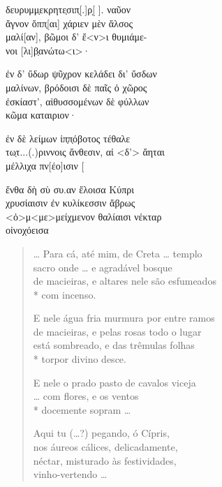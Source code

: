 \begin{gkverse}
\dagger{}δευρυμμ̣εκρητε̣σιπ̣[.]ρ[̣ \quad].\dagger{} ναῦον\\
ἄγνον ὄππ̣[αι\quad] χάριεν μὲν ἄλσος\\
μαλί[αν], βῶμοι δ’ ἔ<ν>ι θυμιάμε-\\
νοι [λι]β̣ανώτω<ι>·

ἐν δ’ ὔδωρ ψῦχρον κελάδει δι’ ὔσδων\\
μαλίνων, βρόδοισι δὲ παῖς ὀ χῶρος\\
ἐσκίαστ’, αἰθυσσομένων δὲ φύλλων\\
κῶμα \dagger{}καταιριον·

ἐν δὲ λείμων ἰπ̣π̣όβοτος τέθαλε\\
\dagger{}τω̣τ...(.)ριννοις\dagger{} ἄνθεσιν, αἰ <δ’> ἄηται\\
μέλλιχα πν[έο]ισιν [\\
\quad[\qquad\qquad]

ἔνθα δὴ σὺ \dagger{}συ.αν\dagger{} ἔλοισα Κύπρι\\
χρυσίαισιν ἐν κυλίκεσσιν ἄβρως\\
<ὀ>μ<με>μείχμενον θαλίαισι νέκταρ\\
οἰνοχόεισα
\end{gkverse}

\begin{verse}
\ldots{} Para cá, até mim, de Creta \ldots{} templo\\
sacro onde \ldots{} e agradável bosque\\
de macieiras, e altares nele são esfumeados\\*
com incenso.

E nele água fria murmura por entre ramos\\
de macieiras, e pelas rosas todo o lugar\\
está sombreado, e das trêmulas folhas\\*
torpor divino desce.

E nele o prado pasto de cavalos viceja\\
\ldots{} com flores, e os ventos\\*
docemente sopram \ldots{}

Aqui tu (\ldots{}?) pegando, ó Cípris,\\ \EP[1]
nos áureos cálices, delicadamente,\\
néctar, misturado às festividades,\\
vinho-vertendo \ldots{}
\end{verse}


